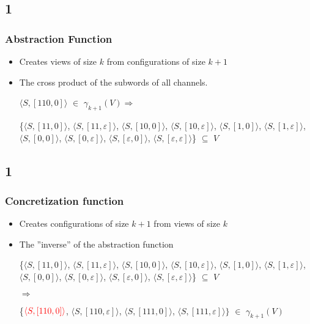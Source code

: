 \documentclass[handout]{beamer}
\begin{document}
\subsection*{1}
\begin{frame}
  \frametitle{Abstraction Function}
  \begin{itemize}
  \item
    Creates views of size $k$ from configurations of size $k+1$
  \item
    The cross product of the subwords of all channels.

    \begin{example}[$\alpha$ for ABP with $k=2$]

    $\langle S, [110,0]\rangle$ $\in$ $\gamma_{k+1}(V) \Rightarrow$

    \{$\langle S, [11, 0]\rangle$, $\langle S, [11, \varepsilon]\rangle$, $\langle S, [10, 0]\rangle$, $\langle S, [10, \varepsilon]\rangle$, $\langle S, [1, 0]\rangle$, $\langle S, [1,\varepsilon ]\rangle$, $\langle S,[0,0]\rangle$, $\langle S, [0,\varepsilon]\rangle$, $\langle S, [\varepsilon, 0]\rangle$, $\langle S, [\varepsilon, \varepsilon]\rangle$\} $\subseteq$ $V$

    \end{example}
  \end{itemize}
\end{frame}

\subsection*{1}
\begin{frame}
  \frametitle{Concretization function}
  \begin{itemize}
  \item
    Creates configurations of size $k+1$ from views of size $k$
  \item
    The ''inverse'' of the abstraction function

    \begin{example}[$\gamma$ for ABP with $k=2$]


    \{$\langle S, [11, 0]\rangle$, $\langle S, [11, \varepsilon]\rangle$, $\langle S, [10, 0]\rangle$, $\langle S, [10, \varepsilon]\rangle$, $\langle S, [1, 0]\rangle$, $\langle S, [1,\varepsilon ]\rangle$, $\langle S,[0,0]\rangle$, $\langle S, [0,\varepsilon]\rangle$, $\langle S, [\varepsilon, 0]\rangle$, $\langle S, [\varepsilon, \varepsilon]\rangle$\} $\subseteq$ $V$

  $\Rightarrow$

\{${\color{red}\langle S, [110,0]\rangle}$,
  $\langle S, [110,\varepsilon]\rangle$,
$\langle S, [111,0]\rangle$,
$\langle S, [111,\varepsilon]\rangle\}$
$\in$ $\gamma_{k+1}(V)$
    \end{example}
  \end{itemize}
\end{frame}
\end{document}

